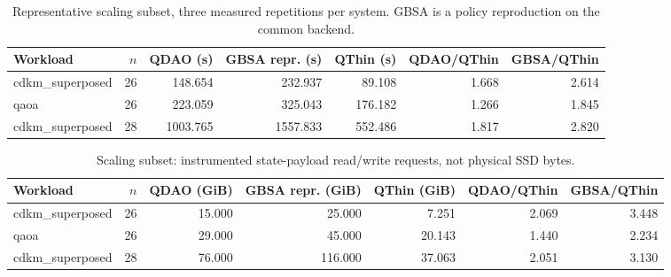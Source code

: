 \begin{table}[t]
\centering
\small
\caption{Representative scaling subset, three measured repetitions per system. GBSA is a policy reproduction on the common backend.}
\label{tab:scaling-runtime}
\begin{tabular}{lrrrrrr}
\hline
Workload & $n$ & QDAO (s) & GBSA repr. (s) & QThin (s) & QDAO/QThin & GBSA/QThin \\
\hline
cdkm\_superposed & 26 & 148.654 & 232.937 & 89.108 & 1.668 & 2.614 \\
qaoa & 26 & 223.059 & 325.043 & 176.182 & 1.266 & 1.845 \\
cdkm\_superposed & 28 & 1003.765 & 1557.833 & 552.486 & 1.817 & 2.820 \\
\hline
\end{tabular}
\end{table}

\begin{table}[t]
\centering
\small
\caption{Scaling subset: instrumented state-payload read/write requests, not physical SSD bytes.}
\label{tab:scaling-traffic}
\begin{tabular}{lrrrrrr}
\hline
Workload & $n$ & QDAO (GiB) & GBSA repr. (GiB) & QThin (GiB) & QDAO/QThin & GBSA/QThin \\
\hline
cdkm\_superposed & 26 & 15.000 & 25.000 & 7.251 & 2.069 & 3.448 \\
qaoa & 26 & 29.000 & 45.000 & 20.143 & 1.440 & 2.234 \\
cdkm\_superposed & 28 & 76.000 & 116.000 & 37.063 & 2.051 & 3.130 \\
\hline
\end{tabular}
\end{table}
